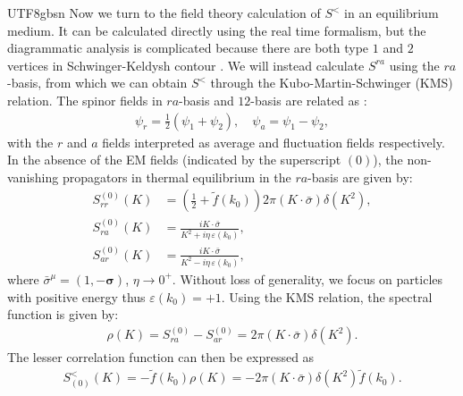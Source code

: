 \documentclass[11pt]{article}\def\baselinestretch{1.4}
\def\d{{\delta}}
\def\p{{\pi}}
\def\s{{\sigma}}
\def\({\left(}
\def\){\right)}
\begin{document}
\begin{CJK}{UTF8}{gbsn}
Now we turn to the field theory calculation of $S^<$ in an equilibrium medium. It can be calculated directly using the real time formalism, but the diagrammatic analysis is complicated because there are both type $1$ and $2$ vertices in Schwinger-Keldysh contour \cite{le2000thermal}. We will instead calculate $S^{ra}$ using the $ra$-basis, from which we can obtain $S^<$ through the Kubo-Martin-Schwinger (KMS) relation.
The spinor fields in $ra$-basis and $12$-basis are related as \cite{Chou:1984es}:
\begin{align}
    \psi _r = \frac{1}{2}(\psi _1 + \psi _2), \quad \psi _a = \psi _1 - \psi _2,
\end{align}
with the $r$ and $a$ fields interpreted as average and fluctuation fields respectively.
In the absence of the EM fields (indicated by the superscript $(0)$), the non-vanishing propagators in thermal equilibrium in the $ra$-basis are given by:
\begin{align}
    S_{rr}^{(0)}(K)&=\(\frac{1}{2}+\tilde{f}(k_0)\)2\p(K\cdot\bar{\s})\d(K^2),\label{S_prop1}\\
    S_{ra}^{(0)}(K)&=\frac{iK \cdot \bar{\sigma}}{K^2+i \eta\,\varepsilon(k_0)}, \label{S_prop2}\\
    S_{ar}^{(0)}(K)&=\frac{iK \cdot \bar{\sigma}}{K^2-i \eta\,\varepsilon(k_0)},\label{S_prop3}
\end{align}
where $\bar{\sigma}^\mu=(1,-\boldsymbol{\sigma})$, $\eta \to 0^+$. Without loss of generality, we focus on particles with positive energy thus $\varepsilon(k_0)=+1$. Using the KMS relation, the spectral function is given by:
\begin{align}
    \rho (K) = S_{ra}^{(0)}-S_{ar}^{(0)} = 2\pi (K \cdot \bar{\sigma})\delta (K^2) .\label{spectral_function}
\end{align}
The lesser correlation function can then be expressed as
\begin{align}
    S^<_{(0)}(K)=-\tilde{f}(k_0)\rho (K)=-2\pi (K \cdot \bar{\sigma})\delta (K^2)\tilde{f}(k_0) \label{free_lesser_propagator}.
\end{align}


\end{CJK}
\end{document}
